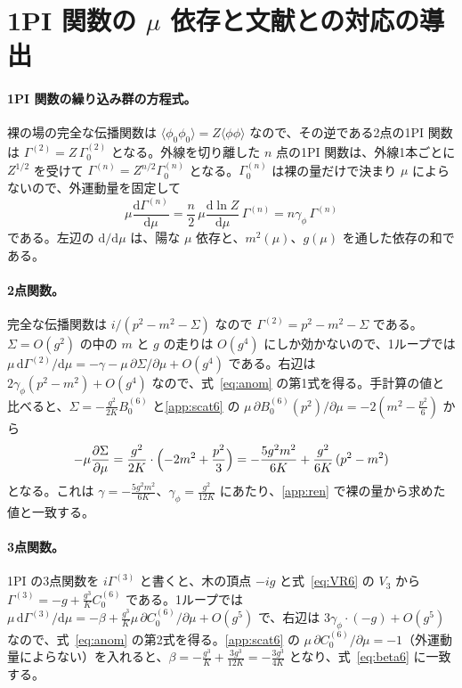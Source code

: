 \documentclass[a4paper,10pt]{ltjsarticle}
\newcommand{\dd}{\mathrm{d}}
\begin{document}
\section{1PI 関数の $\mu$ 依存と文献との対応の導出}\label{app:anom}

\paragraph{1PI 関数の繰り込み群の方程式。}裸の場の完全な伝播関数は $\langle\phi_0\phi_0\rangle=Z\langle\phi\phi\rangle$ なので、その逆である2点の1PI 関数は $\Gamma^{(2)}=Z\,\Gamma_0^{(2)}$ となる。外線を切り離した $n$ 点の1PI 関数は、外線1本ごとに $Z^{1/2}$ を受けて $\Gamma^{(n)}=Z^{n/2}\Gamma^{(n)}_0$ となる。$\Gamma^{(n)}_0$ は裸の量だけで決まり $\mu$ によらないので、外運動量を固定して
\begin{equation*}
\mu\frac{\dd\Gamma^{(n)}}{\dd\mu}=\frac n2\,\mu\frac{\dd\ln Z}{\dd\mu}\,\Gamma^{(n)}=n\gamma_\phi\,\Gamma^{(n)}
\end{equation*}
である。左辺の $\dd/\dd\mu$ は、陽な $\mu$ 依存と、$m^2(\mu)$、$g(\mu)$ を通した依存の和である。

\paragraph{2点関数。}完全な伝播関数は $i/(p^2-m^2-\Sigma)$ なので $\Gamma^{(2)}=p^2-m^2-\Sigma$ である。$\Sigma=O(g^2)$ の中の $m$ と $g$ の走りは $O(g^4)$ にしか効かないので、1ループでは $\mu\,\dd\Gamma^{(2)}/\dd\mu=-\gamma-\mu\,\partial\Sigma/\partial\mu+O(g^4)$ である。右辺は $2\gamma_\phi(p^2-m^2)+O(g^4)$ なので、式~\eqref{eq:anom} の第1式を得る。手計算の値と比べると、$\Sigma=-\frac{g^2}{2K}B_0^{(6)}$ と\ref{app:scat6} の $\mu\,\partial B_0^{(6)}(p^2)/\partial\mu=-2(m^2-\frac{p^2}6)$ から
\begin{equation*}
-\mu\frac{\partial\Sigma}{\partial\mu}=\frac{g^2}{2K}\cdot\Bigl(-2m^2+\frac{p^2}3\Bigr)=-\frac{5g^2m^2}{6K}+\frac{g^2}{6K}\,(p^2-m^2)
\end{equation*}
となる。これは $\gamma=-\frac{5g^2m^2}{6K}$、$\gamma_\phi=\frac{g^2}{12K}$ にあたり、\ref{app:ren} で裸の量から求めた値と一致する。

\paragraph{3点関数。}1PI の3点関数を $i\Gamma^{(3)}$ と書くと、木の頂点 $-ig$ と式~\eqref{eq:VR6} の $V_3$ から $\Gamma^{(3)}=-g+\frac{g^3}{K}C_0^{(6)}$ である。1ループでは $\mu\,\dd\Gamma^{(3)}/\dd\mu=-\beta+\frac{g^3}{K}\mu\,\partial C_0^{(6)}/\partial\mu+O(g^5)$ で、右辺は $3\gamma_\phi\cdot(-g)+O(g^5)$ なので、式~\eqref{eq:anom} の第2式を得る。\ref{app:scat6} の $\mu\,\partial C_0^{(6)}/\partial\mu=-1$（外運動量によらない）を入れると、$\beta=-\frac{g^3}{K}+\frac{3g^3}{12K}=-\frac{3g^3}{4K}$ となり、式~\eqref{eq:beta6} に一致する。
\end{document}
